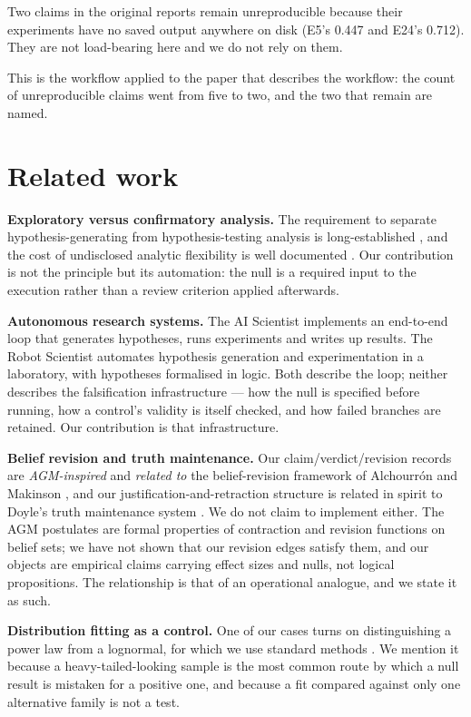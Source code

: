 \documentclass[11pt]{article}
\begin{document}
Two claims in the original reports remain unreproducible because their
experiments have no saved output anywhere on disk (E5's 0.447 and E24's
0.712). They are not load-bearing here and we do not rely on them.

This is the workflow applied to the paper that describes the workflow: the
count of unreproducible claims went from five to two, and the two that
remain are named.

\section{Related work}
\label{sec:related}

\textbf{Exploratory versus confirmatory analysis.} The requirement to
separate hypothesis-generating from hypothesis-testing analysis is
long-established \cite{tukey1980we}, and the cost of undisclosed
analytic flexibility is well documented \cite{simmons2011false}. Our
contribution is not the principle but its automation: the null is a
required input to the execution rather than a review criterion applied
afterwards.

\textbf{Autonomous research systems.} The AI Scientist
\cite{lu2024aiscientist} implements an end-to-end loop that generates
hypotheses, runs experiments and writes up results. The Robot Scientist
\cite{king2004robot} automates hypothesis generation and experimentation
in a laboratory, with hypotheses formalised in logic. Both describe the
loop; neither describes the falsification infrastructure --- how the null is
specified before running, how a control's validity is itself checked, and
how failed branches are retained. Our contribution is that infrastructure.

\textbf{Belief revision and truth maintenance.} Our claim/verdict/revision
records are \emph{AGM-inspired} and \emph{related to} the belief-revision
framework of Alchourr\'on and Makinson \cite{agm1982logic}, and our
justification-and-retraction structure is related in spirit to Doyle's
truth maintenance system \cite{doyle1979tms}. We do not claim to implement
either. The AGM postulates are formal properties of contraction and
revision functions on belief sets; we have not shown that our revision
edges satisfy them, and our objects are empirical claims carrying effect
sizes and nulls, not logical propositions. The relationship is that of an
operational analogue, and we state it as such.

\textbf{Distribution fitting as a control.} One of our cases turns on
distinguishing a power law from a lognormal, for which we use standard
methods \cite{clauset2009powerlaw}. We mention it because a
heavy-tailed-looking sample is the most common route by which a null
result is mistaken for a positive one, and because a fit compared against
only one alternative family is not a test.
\end{document}
